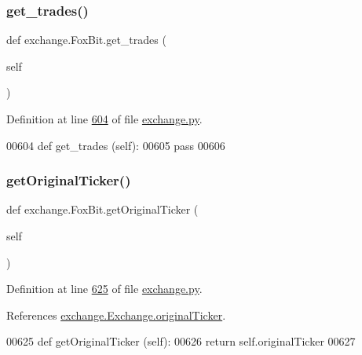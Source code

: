 \subsubsection{\texorpdfstring{get\+\_\+trades()}{get\_trades()}}
{\footnotesize\ttfamily def exchange.\+Fox\+Bit.\+get\+\_\+trades (\begin{DoxyParamCaption}\item[{}]{self }\end{DoxyParamCaption})}



Definition at line \hyperlink{exchange_8py_source_l00604}{604} of file \hyperlink{exchange_8py_source}{exchange.\+py}.


\begin{DoxyCode}
00604     \textcolor{keyword}{def }get\_trades (self):
00605         \textcolor{keywordflow}{pass}
00606     
\end{DoxyCode}
\mbox{\label{classexchange_1_1_fox_bit_adfca60ed33245c7bd9666893f6725bb9}} 
\subsubsection{\texorpdfstring{get\+Original\+Ticker()}{getOriginalTicker()}}
{\footnotesize\ttfamily def exchange.\+Fox\+Bit.\+get\+Original\+Ticker (\begin{DoxyParamCaption}\item[{}]{self }\end{DoxyParamCaption})}



Definition at line \hyperlink{exchange_8py_source_l00625}{625} of file \hyperlink{exchange_8py_source}{exchange.\+py}.



References \hyperlink{exchange_8py_source_l00186}{exchange.\+Exchange.\+original\+Ticker}.


\begin{DoxyCode}
00625     \textcolor{keyword}{def }getOriginalTicker (self):
00626         \textcolor{keywordflow}{return} self.originalTicker
00627                 
\end{DoxyCode}
\mbox{\label{classexchange_1_1_fox_bit_a17b3a7fb364fbfd2c6cf34129194284c}} 
